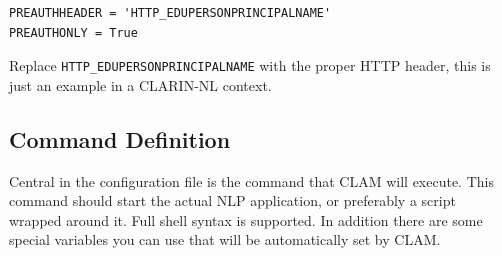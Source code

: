 \documentclass[a4paper,12pt]{report}
\begin{document}
\begin{verbatim}
PREAUTHHEADER = 'HTTP_EDUPERSONPRINCIPALNAME'
PREAUTHONLY = True
\end{verbatim}

Replace \texttt{HTTP\_EDUPERSONPRINCIPALNAME} with the proper HTTP header, this
is just an example in a CLARIN-NL context.


\subsection{Command Definition} \label{sec:command}

Central in the configuration file is the command that CLAM will execute. This
command should start the actual NLP application, or preferably a script wrapped
around it. Full shell syntax is supported. In addition there are some special
variables you can use that will be automatically set by CLAM. 
\end{document}
